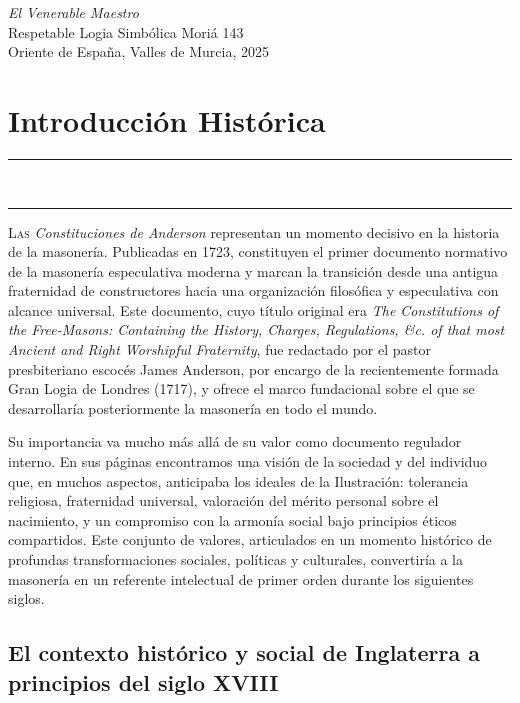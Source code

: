 \documentclass[a4paper,12pt,twoside]{book}
\newcommand{\ornline}{%
\begin{center}
\textcolor{dorado}{{\LARGE\rule{0.2\textwidth}{0.4pt}}~\scalebox{1.2}{❧}~\scalebox{1.2}{❧}~\scalebox{1.2}{❧}~
{\LARGE\rule{0.2\textwidth}{0.4pt}}}
\end{center}}
\begin{document}
\vspace{1cm}
\begin{flushright}
\textit{El Venerable Maestro}\\
Respetable Logia Simbólica Moriá 143\\
Oriente de España, Valles de Murcia, 2025
\end{flushright}

\clearpage

\tableofcontents
\clearpage

\mainmatter

\chapter{Introducción Histórica}

\ornline
\vspace{1cm}

\lettrine[lines=3, lhang=0.1, loversize=0.1]{\textcolor{borgoña}{L}}{as} \textit{Constituciones de Anderson} representan un momento decisivo en la historia de la masonería. Publicadas en 1723, constituyen el primer documento normativo de la masonería especulativa moderna y marcan la transición desde una antigua fraternidad de constructores hacia una organización filosófica y especulativa con alcance universal. Este documento, cuyo título original era \textit{The Constitutions of the Free-Masons: Containing the History, Charges, Regulations, \&c. of that most Ancient and Right Worshipful Fraternity}, fue redactado por el pastor presbiteriano escocés James Anderson, por encargo de la recientemente formada Gran Logia de Londres (1717), y ofrece el marco fundacional sobre el que se desarrollaría posteriormente la masonería en todo el mundo.

Su importancia va mucho más allá de su valor como documento regulador interno. En sus páginas encontramos una visión de la sociedad y del individuo que, en muchos aspectos, anticipaba los ideales de la Ilustración: tolerancia religiosa, fraternidad universal, valoración del mérito personal sobre el nacimiento, y un compromiso con la armonía social bajo principios éticos compartidos. Este conjunto de valores, articulados en un momento histórico de profundas transformaciones sociales, políticas y culturales, convertiría a la masonería en un referente intelectual de primer orden durante los siguientes siglos.

\section{El contexto histórico y social de Inglaterra a principios del siglo XVIII}
\end{document}
